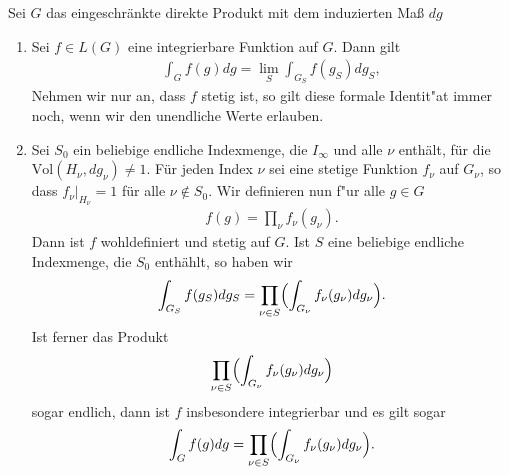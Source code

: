 		\begin{proposition}\label{prop:rdp:integrieren}
			Sei $G$ das eingeschränkte direkte Produkt mit dem induzierten Maß $dg$
			\begin{enumerate}[label=\emph{(\roman*)}]
				\item Sei $f \in L(G)$ eine integrierbare Funktion auf $G$. Dann gilt
					\begin{align*}
						\int_G f(g)dg = \lim_S \int_{G_S} f(g_S) dg_S,
					\end{align*}
					Nehmen wir nur an, dass $f$ stetig ist, so gilt diese formale Identit"at immer noch, wenn wir den unendliche Werte erlauben.
				\item Sei $S_0$ ein beliebige endliche Indexmenge, die $I_\infty$ und alle $\nu$ enthält, für die $\text{Vol}(H_\nu, dg_\nu) \not= 1$. 
					Für jeden Index $\nu$ sei eine stetige Funktion $f_\nu$ auf $G_\nu$, so dass $f_\nu |_{H_\nu} = 1$ für alle $\nu \notin S_0$. 
					Wir definieren nun f"ur alle $g\in G$ 
					\begin{align*}
						f(g) = \prod_{\nu}f_\nu(g_\nu).
					\end{align*} 
					Dann ist $f$ wohldefiniert und stetig auf $G$. 
					Ist $S$ eine beliebige endliche Indexmenge, die $S_0$ enthählt, so haben wir
					\begin{align}\label{eq:satz:integration}
						\int_{G_S} f(g_S) dg_S = \prod_{\nu\in S}\Bigl(\int_{G_\nu} f_\nu (g_\nu)dg_\nu\Bigr).
					\end{align}
					Ist ferner das Produkt
					\begin{align*}
						\prod_{\nu\in S}\Bigl(\int_{G_\nu} f_\nu (g_\nu)dg_\nu\Bigr)
					\end{align*}
					sogar endlich, dann ist $f$ insbesondere integrierbar und es gilt sogar
					\begin{align*}
						\int_{G} f(g) dg = \prod_{\nu\in S}\Bigl(\int_{G_\nu} f_\nu (g_\nu)dg_\nu\Bigr).
					\end{align*}	
			\end{enumerate}
		\end{proposition}
